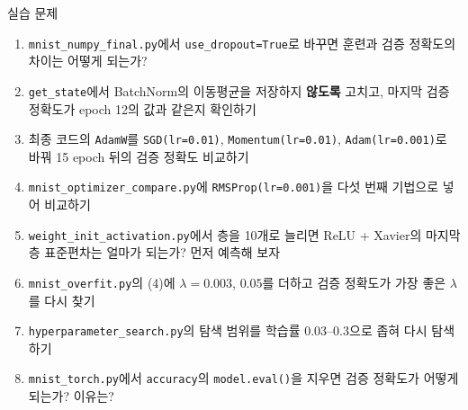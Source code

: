 \documentclass[aspectratio=169,11pt]{beamer}
\newcommand{\code}[1]{\texttt{#1}}
\begin{document}
\begin{frame}[shrink]{실습 문제}
\small
\small
\begin{enumerate}
\item \code{mnist\_numpy\_final.py}에서 \code{use\_dropout=True}로 바꾸면 훈련과 검증 정확도의 차이는 어떻게 되는가?
\item \code{get\_state}에서 BatchNorm의 이동평균을 저장하지 \textbf{않도록} 고치고, 마지막 검증 정확도가 epoch 12의 값과 같은지 확인하기
\item 최종 코드의 \code{AdamW}를 \code{SGD(lr=0.01)}, \code{Momentum(lr=0.01)}, \code{Adam(lr=0.001)}로 바꿔 15 epoch 뒤의 검증 정확도 비교하기
\item \code{mnist\_optimizer\_compare.py}에 \code{RMSProp(lr=0.001)}을 다섯 번째 기법으로 넣어 비교하기
\item \code{weight\_init\_activation.py}에서 층을 10개로 늘리면 ReLU + Xavier의 마지막 층 표준편차는 얼마가 되는가? 먼저 예측해 보자
\item \code{mnist\_overfit.py}의 (4)에 $\lambda=0.003$, $0.05$를 더하고 검증 정확도가 가장 좋은 $\lambda$를 다시 찾기
\item \code{hyperparameter\_search.py}의 탐색 범위를 학습률 $0.03$--$0.3$으로 좁혀 다시 탐색하기
\item \code{mnist\_torch.py}에서 \code{accuracy}의 \code{model.eval()}을 지우면 검증 정확도가 어떻게 되는가? 이유는?
\end{enumerate}
\end{frame}
\end{document}
